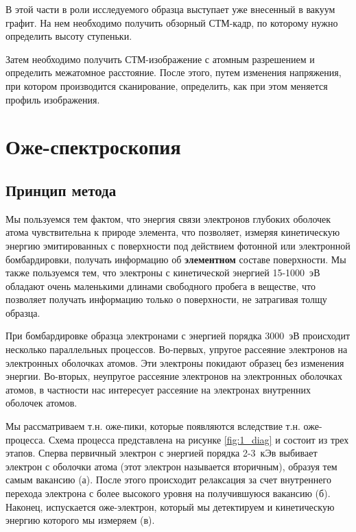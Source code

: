 \documentclass[a4paper, 12pt]{article}
\begin{document}
В этой части в роли исследуемого образца выступает уже внесенный в вакуум графит. На нем необходимо получить обзорный СТМ-кадр, по которому нужно определить высоту ступеньки. 

Затем необходимо получить СТМ-изображение с атомным разрешением и определить межатомное расстояние. После этого, путем изменения напряжения, при котором производится сканирование, определить, как при этом меняется профиль изображения.


\section{Оже-спектроскопия}

\subsection{Принцип метода}

Мы пользуемся тем фактом, что энергия связи электронов глубоких оболочек атома чувствительна к природе элемента, что позволяет, измеряя кинетическую энергию эмитированных с поверхности под действием фотонной или электронной бомбардировки, получать информацию об \textbf{элементном} составе поверхности. Мы также пользуемся тем, что электроны с кинетической энергией 15-1000~эВ обладают очень маленькими длинами свободного пробега в веществе, что позволяет получать информацию только о поверхности, не затрагивая толщу образца.

При бомбардировке образца электронами с энергией порядка 3000~эВ происходит несколько параллельных процессов. Во-первых, упругое рассеяние электронов на электронных оболочках атомов. Эти электроны покидают образец без изменения энергии. Во-вторых, неупругое рассеяние электронов на электронных оболочках атомов, в частности нас интересует рассеяние на электронах внутренних оболочек атомов.

Мы рассматриваем т.н. оже-пики, которые появляются вследствие т.н. оже-процесса. Схема процесса представлена на рисунке \ref{fig:1_diag} и состоит из трех этапов. Сперва первичный электрон с энергией порядка 2-3~кЭв выбивает электрон с оболочки атома (этот электрон называется вторичным), образуя тем самым вакансию (а). После этого происходит релаксация за счет внутреннего перехода электрона с более высокого уровня на получившуюся вакансию (б). Наконец, испускается оже-электрон, который мы детектируем и кинетическую энергию которого мы измеряем (в).
\end{document}
